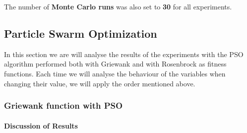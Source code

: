 \documentclass[12pt,a4paper]{article}
\begin{document}
The number of \textbf{Monte Carlo runs} was also set to \textbf{30} for all experiments.
\subsection{Particle Swarm Optimization}
In this section we are will analyse the results of the experiments with the PSO algorithm performed both with Griewank and with Rosenbrock as fitness functions. Each time we will analyse the behaviour of the variables when changing their value, we will apply the order mentioned above.

\subsubsection{Griewank function with PSO}
\paragraph{Discussion of Results}
\end{document}
